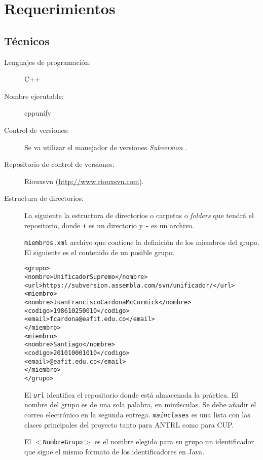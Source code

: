\documentclass{article}
\theoremstyle{definition}
\begin{document}
\section{Requerimientos}
\label{sec:requerimientos}


\subsection{Técnicos}
\label{sec:reqtec}

\begin{description}
\item[Lenguajes de programación:] C++
\item[Nombre ejecutable:] cppunify
\item[Control de versiones:] Se va utilizar el manejador de versiones
  \emph{Subversion}
  \parencite{collins-sussman--fitzpatrick-pilato-2011}.
\item[Repositorio de control de versiones:] Riouxsvn (\url{http://www.riouxsvn.com}).
\item[Estructura de directorios:] La siguiente la estructura de
  directorios o carpetas o \emph{folders} que tendrá el repositorio, donde
  \texttt{+} es un directorio y \texttt{-} es un archivo.
\begin{alltt}
\end{alltt}

  \texttt{miembros.xml} archivo que contiene la definición de los
  miembros del grupo. El siguiente es el contenido de un posible grupo.

  {\footnotesize
\begin{alltt}
<grupo>
   <nombre>UnificadorSupremo</nombre>
   <url>https://subversion.assembla.com/svn/unificador/</url>
   <miembro>
      <nombre>Juan Francisco Cardona McCormick</nombre>
      <codigo>198610250010</codigo>
      <email>fcardona@eafit.edu.co</email>
   </miembro>
   <miembro>
      <nombre>Santiago </nombre>
      <codigo>201010001010</codigo>
      <email>@eafit.edu.co</email>
   </miembro>
</grupo>
\end{alltt}
  }

  El \emph{\texttt{url}} identifica el repositorio donde está
  almacenada la práctica.  El nombre del grupo es de una sola palabra,
  en minúsculas. Se debe añadir el correo electrónico en la segunda
  entrega. \emph{\texttt{mainclases}} es una lista con las clases
  principales del proyecto tanto para ANTRL como para CUP.

  El \texttt{$<$NombreGrupo$>$} es el nombre elegido para su grupo un identificador que
  sigue el mismo formato de los identificadores en Java.


\end{description}
\end{document}
